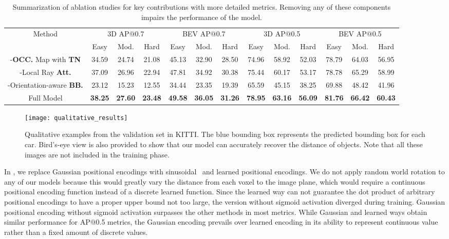\documentclass[10pt,twocolumn,letterpaper]{article}
\begin{document}
\begin{table*}
  \centering
  \begin{tabular}{c|ccc|ccc|ccc|ccc}
    \toprule
    \multirow{2}{*}{Method} & \multicolumn{3}{c|}{3D AP@0.7} & \multicolumn{3}{c|}{BEV AP@0.7} & \multicolumn{3}{c|}{3D AP@0.5} & \multicolumn{3}{|c}{BEV AP@0.5} \\ 
    & Easy     & Mod. & Hard  & Easy     & Mod. & Hard  & Easy     & Mod. & Hard  & Easy     & Mod. & Hard\\
    \midrule
    -{\bf OCC.} Map with {\bf TN}      & 34.59 & 24.74 & 21.08 &	45.13 & 32.90 &	28.50 &	74.96 &	58.92 &	52.03 &	78.79 &	64.03 &	56.95 \\
    -Local Ray \bf{Att}.     & 37.09 &	26.96 &	22.94 &	47.81 &	34.92 &	30.38 &	75.44 &	60.17 &	53.17 &	78.78 &	65.29 &	58.99 \\
    -Orientation-aware {\bf BB.}  & 23.12 &	15.23 &	12.55 &	34.44 &	23.35 &	19.39 &	65.59 &	45.15 &	38.25 &	69.88 &	48.42 &	41.96 \\
    Full Model          & \bf{38.25}	&	\bf{27.60} & \bf{23.48}	&	\bf{49.58}	&	\bf{36.05}	&	\bf{31.26}	&	\bf{78.95}	&	\bf{63.16}	&	\bf{56.09}	&	\bf{81.76}	&	\bf{66.42}	&	\bf{60.43} \\
    \bottomrule
  \end{tabular}
  \caption{Summarization of ablation studies for key contributions with more detailed metrics. Removing any of these components impairs the performance of the model.}
  \label{tab:key_contributions}
\end{table*} \begin{figure*}
  \centering
  \texttt{[image: qualitative\_results]}
  \caption{Qualitative examples from the validation set in KITTI. The blue bounding box represents the predicted bounding box for each car. Bird's-eye view is also provided to show that our model can accurately recover the distance of objects. Note that all these images are not included in the training phase.}
  \label{fig:qualitative_results}
\end{figure*}

\noindent \fontsize{10pt}{\baselineskip}\selectfont {\bf Positional Encodings.}
In , we replace Gaussian positional encodings with sinusoidal~\cite{NIPS2017_3f5ee243} and learned positional encodings. We do not apply random world rotation to any of our models because this would greatly vary the distance from each voxel to the image plane, which would require a continuous positional encoding function instead of a discrete learned function. Since the learned way can not guarantee the dot product of arbitrary positional encodings to have a proper upper bound not too large, the version without sigmoid activation diverged during training. Gaussian positional encoding without sigmoid activation surpasses the other methods in most metrics. While Gaussian and learned ways obtain similar performance for AP@0.5 metrics, the Gaussian encoding prevails over learned encoding in its ability to represent continuous value rather than a fixed amount of discrete values.
\setlength{\parskip}{5pt}
\end{document}
